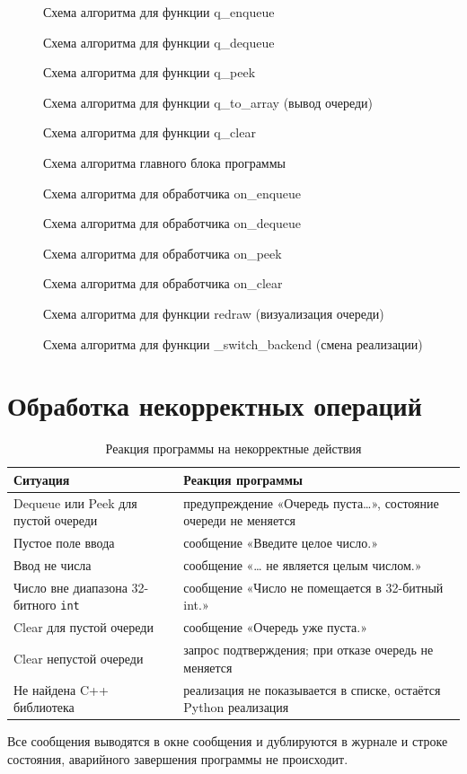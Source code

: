 \documentclass[oneside,a4paper,14pt]{extarticle} %
\newcommand{\flowfig}[3][1]{%
  \begin{figure}[H]\centering
  \scalebox{#1}{}
  \caption{#3}\end{figure}}
\begin{document}
\flowfig[0.78]{enqueue}{Схема алгоритма для функции q\_enqueue}
\flowfig[0.78]{dequeue}{Схема алгоритма для функции q\_dequeue}
\flowfig{peek}{Схема алгоритма для функции q\_peek}
\flowfig[0.9]{toarray}{Схема алгоритма для функции q\_to\_array (вывод очереди)}
\flowfig[0.9]{clear}{Схема алгоритма для функции q\_clear}
\flowfig[0.78]{main}{Схема алгоритма главного блока программы}
\flowfig[0.75]{on_enqueue}{Схема алгоритма для обработчика on\_enqueue}
\flowfig{on_dequeue}{Схема алгоритма для обработчика on\_dequeue}
\flowfig{on_peek}{Схема алгоритма для обработчика on\_peek}
\flowfig[0.9]{on_clear}{Схема алгоритма для обработчика on\_clear}
\flowfig[0.72]{redraw}{Схема алгоритма для функции redraw (визуализация очереди)}
\flowfig[0.8]{switch}{Схема алгоритма для функции \_switch\_backend (смена реализации)}

\section{Обработка некорректных операций}
\begin{table}[H]
\caption{Реакция программы на некорректные действия}
\centering\small\singlespacing
\begin{tabular}{|p{5.6cm}|p{9.4cm}|}\hline
\textbf{Ситуация} & \textbf{Реакция программы}\\\hline
Dequeue или Peek для пустой очереди & предупреждение «Очередь пуста\ldots{}», состояние очереди не меняется\\\hline
Пустое поле ввода & сообщение «Введите целое число.»\\\hline
Ввод не числа & сообщение «\ldots{} не является целым числом.»\\\hline
Число вне диапазона 32-битного \texttt{int} & сообщение «Число не помещается в 32-битный int.»\\\hline
Clear для пустой очереди & сообщение «Очередь уже пуста.»\\\hline
Clear непустой очереди & запрос подтверждения; при отказе очередь не меняется\\\hline
Не найдена C++ библиотека & реализация не показывается в списке, остаётся Python реализация\\\hline
\end{tabular}
\end{table}
Все сообщения выводятся в окне сообщения и дублируются в журнале и строке состояния, аварийного завершения программы не происходит.
\end{document}
